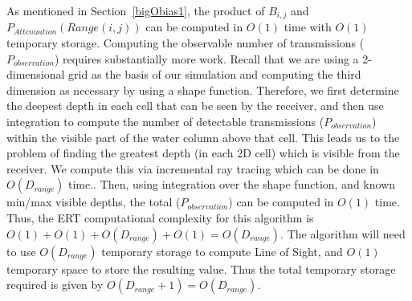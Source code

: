 As mentioned in Section~\ref{bigObias1}, the product of $B_{i,j}$ and $P_{Attenuation}(Range(i,j))$ can be computed in $O(1)$ time with $O(1)$ temporary storage.  Computing the observable number of transmissions ($P_{observation}$) requires substantially more work.  Recall that we are using a 2-dimensional grid as the basis of our simulation and computing the third dimension as necessary by using a shape function.  Therefore, we first determine the deepest depth in each cell that can be seen by the receiver, and then use integration to compute the number of detectable transmissions ($P_{observation}$) within the visible part of the water column above that cell.  This leads us to the problem of finding the greatest depth (in each 2D cell) which is visible from the receiver.  We compute this via incremental ray tracing which can be done in  $O(D_{range})$ time.\cite{rayTracing}.  Then, using integration over the shape function, and known min/max visible depths, the total ($P_{observation}$) can be computed in $O(1)$ time.  Thus, the ERT computational complexity for this algorithm is $O(1) + O(1) + O(D_{range}) + O(1) = O(D_{range})$.  The algorithm will need to use $O(D_{range})$ temporary storage to compute Line of Sight, and $O(1)$ temporary space to store the resulting value.  Thus the total temporary storage required is given by $O(D_{range}+1)=O(D_{range})$.


